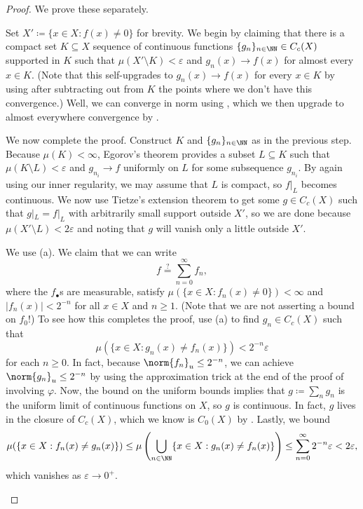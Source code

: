 \documentclass[../notes.tex]{subfiles}
\begin{document}
\begin{proof}
	We prove these separately.
	\begin{listalph}
		\item Set $X'\coloneqq\{x\in X:f(x)\ne0\}$ for brevity. We begin by claiming that there is a compact set $K\subseteq X$ sequence of continuous functions $\{g_n\}_{n\in\NN}\in C_c(X)$ supported in $K$ such that $\mu(X'\setminus K)<\varepsilon$ and $g_n(x)\to f(x)$ for almost every $x\in K$. (Note that this self-upgrades to $g_n(x)\to f(x)$ for every $x\in K$ by using  after subtracting out from $K$ the points where we don't have this convergence.) Well, we can converge in norm using , which we then upgrade to almost everywhere convergence by .

		We now complete the proof. Construct $K$ and $\{g_n\}_{n\in\NN}$ as in the previous step. Because $\mu(K)<\infty$, Egorov's theorem \cite[Theorem~9.13]{elber-top} provides a subset $L\subseteq K$ such that $\mu(K\setminus L)<\varepsilon$ and $g_{n_i}\to f$ uniformly on $L$ for some subsequence $g_{n_i}$. By again using our inner regularity, we may assume that $L$ is compact, so $f|_L$ becomes continuous. We now use Tietze's extension theorem \cite[Theorem~3.26]{elber-top} to get some $g\in C_c(X)$ such that $g|_L=f|_L$ with arbitrarily small support outside $X'$, so we are done because $\mu(X'\setminus L)<2\varepsilon$ and noting that $g$ will vanish only a little outside $X'$.

		\item We use (a). We claim that we can write
		\[f\stackrel?=\sum_{n=0}^\infty f_n,\]
		where the $f_\bullet$s are measurable, satisfy $\mu(\{x\in X:f_n(x)\ne0\})<\infty$ and $\left|f_n(x)\right|<2^{-n}$ for all $x\in X$ and $n\ge1$. (Note that we are not asserting a bound on $f_0$!) To see how this completes the proof, use (a) to find $g_n\in C_c(X)$ such that
		\[\mu(\{x\in X:g_n(x)\ne f_n(x)\})<2^{-n}\varepsilon\]
		for each $n\ge0$. In fact, because $\norm{f_n}_u\le2^{-n}$, we can achieve $\norm{g_n}_u\le2^{-n}$ by using the approximation trick at the end of the proof of  involving $\varphi$. Now, the bound on the uniform bounds implies that $g\coloneqq\sum_ng_n$ is the uniform limit of continuous functions on $X$, so $g$ is continuous. In fact, $g$ lives in the closure of $C_c(X)$, which we know is $C_0(X)$ by . Lastly, we bound
		\[\mu(\{x\in X:f_n(x)\ne g_n(x)\})\le\mu\left(\bigcup_{n\in\NN}\{x\in X:g_n(x)\ne f_n(x)\}\right)\le\sum_{n=0}^\infty2^{-n}\varepsilon<2\varepsilon,\]
		which vanishes as $\varepsilon\to0^+$.


\end{listalph}
\end{proof}
\end{document}
